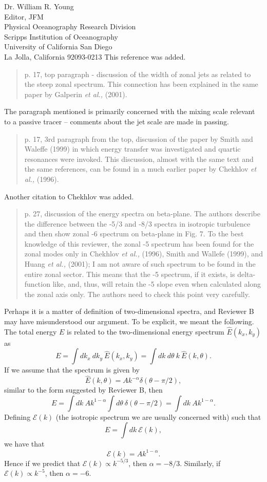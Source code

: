 \documentclass[11pt]{letter}
\newcommand{\etal}{\textit{et al., }}
\newcommand{\ca}  [1]{\mathcal{#1}}
\begin{document}
\begin{letter}{Dr. William R. Young \\
 Editor, JFM \\
 Physical Oceanography Research Division \\
 Scripps Institution of Oceanography \\
 University of California San Diego \\
 La Jolla, California 92093-0213
 }
This reference was added.

\begin{quote}
p. 17, top paragraph - discussion of the width of zonal jets as
related to the steep zonal spectrum. This connection has been
explained in the same paper by Galperin \etal (2001).
\end{quote}

The paragraph mentioned is primarily concerned with the mixing scale
relevant to a passive tracer -- comments about the jet scale are made
in passing.

\begin{quote}
p. 17, 3rd paragraph from the top, discussion of the paper by Smith
and Waleffe (1999) in which energy transfer was investigated and
quartic resonances were invoked.  This discussion, almost with the
same text and the same references, can be found in a much earlier
paper by Chekhlov \etal (1996).
\end{quote}

Another citation to Chekhlov was added.

\begin{quote}
p. 27, discussion of the energy spectra on beta-plane.  The authors
describe the difference between the -5/3 and -8/3 spectra in isotropic
turbulence and then show zonal -6 spectrum on beta-plane in Fig. 7. To the
best knowledge of this reviewer, the zonal -5 spectrum has been found for
the zonal modes only in Chekhlov \etal (1996), Smith and Wallefe (1999),
and Huang \etal (2001); I am not aware of such spectrum to be found in
the entire zonal sector.  This means that the -5 spectrum, if it exists,
is delta-function like, and, thus, will retain the -5 slope even when
calculated along the zonal axis only. The authors need to check this point
very carefully.
\end{quote}

Perhaps it is a matter of definition of two-dimensional spectra,
and Reviewer B may have misunderstood our argument. To be explicit,
we meant the following.  The total energy $E$ is related to the
two-dimensional energy spectrum $\hat{E}(k_x,k_y)$ as
\[
E = \int dk_x~dk_y ~\hat{E}(k_x,k_y) = \int dk~d\theta
~k~\hat{E}(k,\theta).
\]
If we assume that the spectrum is given by
\[
\hat{E}(k,\theta) = A k^{-\alpha}\delta(\theta-\pi/2),
\]
similar to the form suggested by Reviewer B, then
\[
E = \int dk ~A k^{1-\alpha} \int d\theta ~\delta(\theta-\pi/2)
= \int dk ~A k^{1-\alpha}.
\]
Defining $\ca{E}(k)$ (the isotropic spectrum we are usually concerned
with) such that
\[
E = \int dk ~\ca{E}(k),
\]
we have that
\[
\ca{E}(k) = A k^{1-\alpha}.
\]
Hence if we predict that $\ca{E}(k) \propto k^{-5/3}$, then $\alpha =
-8/3$.  Similarly, if $\ca{E}(k) \propto k^{-5}$, then $\alpha =
-6$.


\end{letter}
\end{document}
